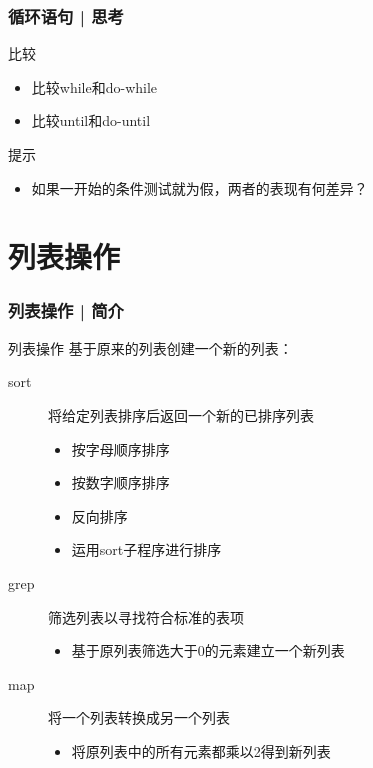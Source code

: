 \begin{frame}
  \frametitle{循环语句 | 思考}
  \begin{block}{比较}
    \begin{itemize}
      \item 比较while和do-while
      \item 比较until和do-until
    \end{itemize}
  \end{block}
  \pause
  \begin{block}{提示}
    \begin{itemize}
      \item 如果一开始的条件测试就为假，两者的表现有何差异？
    \end{itemize}
  \end{block}
\end{frame}

\section{列表操作}
\begin{frame}
  \frametitle{列表操作 | 简介}
  \begin{block}{\alert{列表操作}}
    基于原来的列表创建一个新的列表：
    \begin{description}
      \item[sort] 将给定列表排序后返回一个新的已排序列表
        \begin{itemize}
          \item 按字母顺序排序 
          \item 按数字顺序排序
          \item 反向排序
          \item 运用sort子程序进行排序
        \end{itemize}
      \item[grep] 筛选列表以寻找符合标准的表项
        \begin{itemize}
          \item 基于原列表筛选大于0的元素建立一个新列表
        \end{itemize}
      \item[map] 将一个列表转换成另一个列表
        \begin{itemize}
          \item 将原列表中的所有元素都乘以2得到新列表
        \end{itemize}
    \end{description}
  \end{block}
\end{frame}

